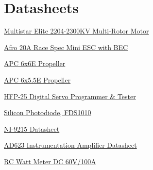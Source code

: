 \documentclass{article}
\begin{document}
\newpage
\begin{appendices}
\pagestyle{fancy}
\renewcommand{\thefigure}{A\arabic{figure}}
\setcounter{figure}{0}

\pagebreak

\hypertarget{datasheets}{}
\section{Datasheets}
\begin{enumerate}[label = {[\arabic*]}]
\small
\item \hypertarget{1}{\href{https://hobbyking.com/en_us/multistar-elite-2204-2300kv-multi-rotor-motor-cw-prop-adapter.html}{Multistar Elite 2204-2300KV Multi-Rotor Motor}}
\item \hypertarget{2}{\href{https://hobbyking.com/en_us/afro-20a-race-spec-mini-esc-with-bec.html}{ Afro 20A Race Spec Mini ESC with BEC}}
\item \hypertarget{3}{\href{https://www.apcprop.com/product/6x6e/}{APC 6x6E Propeller}}
\item \hypertarget{4}{\href{https://www.apcprop.com/product/6x5-5e/}{APC 6x5.5E Propeller}}
\item \hypertarget{5}{\href{https://hitecrcd.com/products/servos/discontinued-servos-servo-accessories/discontinued-programmers/hfp-25-digital-servo-programmer-tester-2/product}{HFP-25 Digital Servo Programmer \& Tester}}
\item \hypertarget{6}{\href{https://www.thorlabs.com/drawings/e7e91d1f442ec5dc-834C7101-FD1F-1B62-609D921F0FC0E314/FDS1010-SpecSheet.pdf}{Silicon Photodiode, FDS1010}}
\item \hypertarget{7}{\href{https://www.amc-systeme.de/files/pdf/ni-9215-amc.pdf}{NI-9215 Datasheet}}
\item \hypertarget{8}{\href{https://www.analog.com/media/en/technical-documentation/data-sheets/ad623.pdf}{AD623 Instrumentation Amplifier Datasheet}}
\item \hypertarget{9}{\href{https://www.amazon.com/Analyzer-Digital-Balance-Battery-Voltage/dp/B0753DPC2D/ref=asc_df_B0753DPC2D/?tag=hyprod-20&linkCode=df0&hvadid=309806250188&hvpos=&hvnetw=g&hvrand=1339579772044864897&hvpone=&hvptwo=&hvqmt=&hvdev=c&hvdvcmdl=&hvlocint=&hvlocphy=9028280&hvtargid=pla-567839154382&psc=1&mcid=0273f08627a23b188506d62979b40559&gclid=CjwKCAjw57exBhAsEiwAaIxaZg9oUrMDzZ3wh-Y_MJXKuUsgDDHnvtvx1OtjC213FpZroDuJ3cO4sBoCM-YQAvD_BwE}{RC Watt Meter DC 60V/100A }}
\end{enumerate}

\end{appendices}
\end{document}
